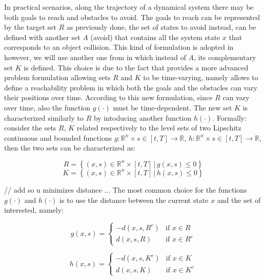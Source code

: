 In practical scenarios, along the trajectory of a dynamical system there may be both goals to reach and obstacles to avoid. The goals to reach can be represented by the target set $R$ as previously done, the set of states to avoid instead, can be defined with another set $A$ (avoid) that contains all the system state $x$ that corresponds to an object collision. This kind of formulation is adopted in \cite{reach_avoid_with_dist} however, we will use another one from \cite{new_paper} in which instead of $A$, its complementary set $K$ is defined. This choice is due to the fact that \cite{new_paper} provides a more advanced problem formulation allowing sets $R$ and $K$ to be time-varying, namely allows to define a reachability problem in which both the goals and the obstacles can vary their positions over time. According to this new formulation, since $R$ can vary over time, also the function $g(\cdot)$ must be time-dependent. The new set $K$ is characterized similarly to $R$ by intoducing another function $h(\cdot)$. Formally: consider the sets $R$, $K$ related respectively to the level sets of two Lipschitz continuous and bounded functions $g: \mathbb{R}^n \times s \in [t, T]\rightarrow \mathbb{R}$, $h: \mathbb{R}^n \times s \in [t, T] \rightarrow \mathbb{R}$, then the two sets can be characterized as:

\begin{equation} 
	\label{R}
	R = \left\{ (x,s) \in \mathbb{R}^n \times [t,T]\,|\, g(x, s) \leq 0 \right\}
\end{equation}
\begin{equation} 
	\label{K}
	K = \left\{(x,s) \in \mathbb{R}^n \times [t,T] \,|\, h(x, s) \leq 0 \right\}
\end{equation}

// add so u minimizes distance ...
The most common choice for the functions $g(\cdot)$ and $h(\cdot)$ is to use the distance between the current state $x$ and the set of interested, namely:

\begin{equation}
\label{g}
    g(x, s) =
\left\{
	\begin{array}{ll}
		-d(x, s, R^c)  & \mbox{if } x \in R \\
		d(x, s, R) & \mbox{if } x \in R^c
	\end{array}
\right.
\end{equation}

\begin{equation}
\label{h}
    h(x, s) =
\left\{
	\begin{array}{ll}
		-d(x, s, K^c)  & \mbox{if } x \in K \\
		d(x, s, K) & \mbox{if } x \in K^c
	\end{array}
\right.
\end{equation}

